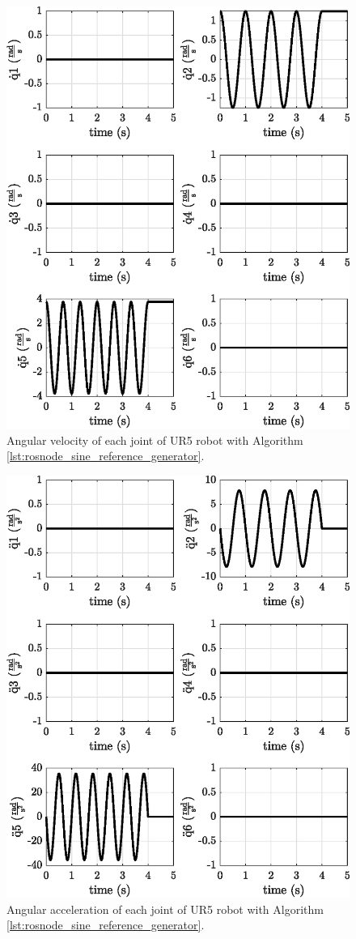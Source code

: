 \begin{figure}
    \centering
    \includegraphics{images/act_1.1/joint_velocity.eps}
    \caption{Angular velocity of each joint of UR5 robot with Algorithm \ref{lst:rosnode_sine_reference_generator}.}
    \label{fig:act_1.1_joint_velocity}
\end{figure}

\begin{figure}
    \centering
    \includegraphics{images/act_1.1/joint_acceleration.eps}
    \caption{Angular acceleration of each joint of UR5 robot with Algorithm \ref{lst:rosnode_sine_reference_generator}.}
    \label{fig:act_1.1_joint_acceleration}
\end{figure}